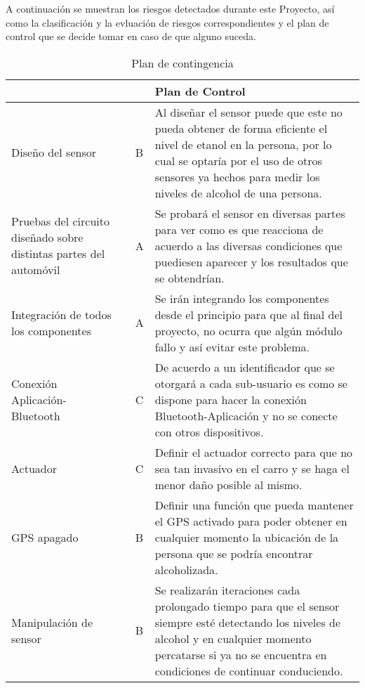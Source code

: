 \documentclass{article}
\begin{document}
A continuación se muestran los riesgos detectados durante este Proyecto, así como la clasificación y la evluación de riesgos correspondientes y el plan de control que se decide tomar en caso de que alguno suceda.

\begin{center}
\begin{table}[!htb]
\centering
\begin{tabular}{|p{4cm}|p{2cm}|p{2cm}|p{5cm}|}
    \hline
    \centering {\bfseries Tipo de Riesgo}  & \centering {\bfseries CR} & \centering {\bfseries VR} & {\bfseries Plan de Control} \\ \hline
    
    \centering Diseño del sensor & \centering 2 & \centering B & Al diseñar el sensor puede que este no pueda obtener de forma eficiente el nivel de etanol en la persona, por lo cual se optaría por el uso de otros sensores ya hechos para medir los niveles de alcohol de una persona.\\ \hline
    
    \centering Pruebas del circuito diseñado sobre distintas partes del automóvil & \centering 1 & \centering A & Se probará el sensor en diversas partes para ver como es que reacciona de acuerdo a las diversas condiciones que puediesen aparecer y los resultados que se obtendrían.\\ \hline
    
    \centering Integración de todos los componentes & \centering 3 & \centering A & Se irán integrando los componentes desde el principio para que al final del proyecto, no ocurra que algún módulo fallo y así evitar este problema.\\ \hline
    
    \centering Conexión Aplicación-Bluetooth & \centering 2 & \centering C & De acuerdo a un identificador que se otorgará a cada sub-usuario es como se dispone para hacer la conexión Bluetooth-Aplicación y no se conecte con otros dispositivos.\\ \hline
    
    \centering Actuador & \centering 2 & \centering C & Definir el actuador correcto para que no sea tan invasivo en el carro y se haga el menor daño posible al mismo.\\ \hline
    
    \centering GPS apagado & \centering 3 & \centering B & Definir una función que pueda mantener el GPS activado para poder obtener en cualquier momento la ubicación de la persona que se podría encontrar alcoholizada.\\ \hline
    
    \centering Manipulación de sensor & \centering 3 & \centering B & Se realizarán iteraciones cada prolongado tiempo para que el sensor siempre esté detectando los niveles de alcohol y en cualquier momento percatarse si ya no se encuentra en condiciones de continuar conduciendo.\\ \hline

\end{tabular}
\caption{Plan de contingencia}
\label{tabla:pobconlimsincolo}
\end{table}
\end{center}
\end{document}
